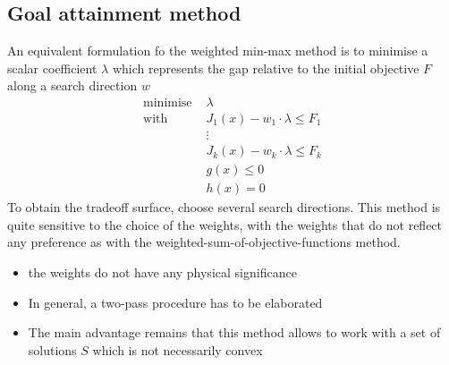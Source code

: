 \documentclass{book}
\begin{document}
\subsection{Goal attainment method}
An equivalent formulation fo the weighted min-max method is to minimise a scalar coefficient $\lambda$ which represents the gap relative to the initial objective $F$ along a search direction $w$
\begin{align*}
    \text{minimise } &\lambda\\ 
    \text{with } & J_1(x)-w_1\cdot\lambda\leq F_1\\
    & \vdots \\
    & J_k(x)-w_k\cdot\lambda\leq F_k\\
    & g(x)\leq 0 \\ 
    & h(x) = 0 
\end{align*}
To obtain the tradeoff surface, choose several search directions. This method is quite sensitive to the choice of the weights, with the weights that do not reflect any preference as with the weighted-sum-of-objective-functions method. 
\begin{itemize}
    \item the weights do not have any physical significance
    \item In general, a two-pass procedure has to be elaborated 
    \item The main advantage remains that this method allows to work with a set of solutions $S$ which is not necessarily convex 
\end{itemize}
\end{document}

